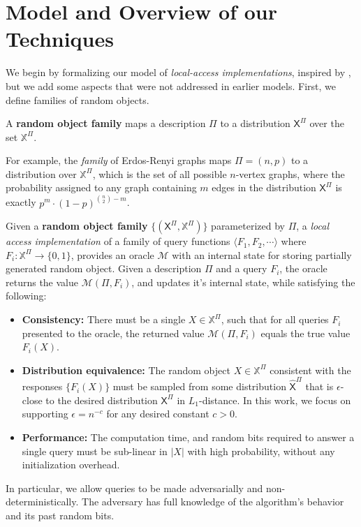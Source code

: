 \section{Model and Overview of our Techniques}
\label{sec:overview_of_our_techniques}
We begin by formalizing our model of \emph{local-access implementations}, inspired by \cite{reut},
but we add some aspects that were not addressed in earlier models.
First, we define families of random objects.

\begin{definition}
\label{def:parametrized_random_object}
A \textbf{random object family} maps a description $\Pi$ to a distribution $\mathsf X^{\Pi}$ over the set $\mathbb X^{\Pi}$.
\end{definition}
For example, the \emph{family} of Erdos-Renyi graphs maps $\Pi = (n, p)$ to a distribution over $\mathbb X^{\Pi}$,
which is the set of all possible $n$-vertex graphs,
where the probability assigned to any graph containing $m$ edges in the distribution $\mathsf X^{\Pi}$ is exactly $p^m\cdot (1-p)^{\binom{n}{2}-m}$.

\begin{definition}
\label{def:local_access}
Given a \textbf{random object family} $\{(\mathsf X^{\Pi}, \mathbb X^{\Pi})\}$ parameterized by $\Pi$, a \emph{local access implementation}
of a family of query functions $\langle F_1, F_2,\cdots \rangle$ where $F_i: \mathbb X^{\Pi}\rightarrow \{0,1\}$,
provides an oracle $\mathcal M$ with an internal state for storing partially generated random object.
Given a description $\Pi$ and a query $F_i$, the oracle returns the value $\mathcal M(\Pi, F_i)$,
and updates it's internal state, while satisfying the following:
\begin{itemize}
    \item \textbf{Consistency:}
    There must be a single $X\in \mathbb X^{\Pi}$, such that for all queries $F_i$ presented to the oracle,
    the returned value $\mathcal M(\Pi,F_i)$ equals the true value $F_i(X)$.
    \item \textbf{Distribution equivalence:}
    The random object $X\in \mathbb X^{\Pi}$ consistent with the responses $\{ F_i(X)\}$ must be sampled from some distribution $\hat{\mathsf{X}}^{\Pi}$
    that is $\epsilon$-close to the desired distribution $\mathsf{X}^{\Pi}$ in $L_1$-distance.
    In this work, we focus on supporting $\epsilon = n^{-c}$ for any desired constant $c>0$.
    \item \textbf{Performance:}
    The computation time, and random bits required to answer a single query must be sub-linear in $|X|$ with high probability,
    without any initialization overhead.
\end{itemize}
In particular, we allow queries to be made adversarially and non-deterministically.
The adversary has full knowledge of the algorithm's behavior and its past random bits.
\end{definition}

